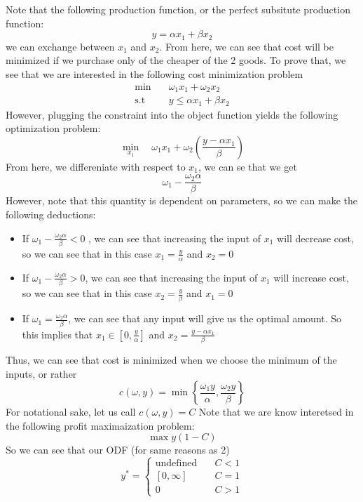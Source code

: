 \documentclass[11pt]{article}
\newcommand{\st}{\text{s.t}}
\begin{document}
\section{}
Note that the following production function, or the perfect subsitute production function:
\[
y = \alpha x_1 + \beta x_2
\]
we can exchange between $x_1$ and $x_2$. From here, we can see that cost will be minimized if we purchase only of the cheaper of the 2 goods. To prove that, we see that we are interested in the following cost minimization problem 
\begin{align*}
    \min & \quad \omega_1 x_1 + \omega_2 x_2\\
    \st & \quad y \leq \alpha x_1 + \beta x_2
\end{align*}
However, plugging the constraint into the object function yields the following optimization problem:
\[
\min_{x_1} \quad \omega_1 x_1 + \omega_2 \left( \frac{y - \alpha x_1}{\beta} \right)
\]
From here, we differeniate with respect to $x_1$, we can se that we get
\[
\omega_1 - \frac{\omega_2 \alpha}{\beta} 
\]
However, note that this quantity is dependent on parameters, so we can make the following deductions:
\begin{itemize}
    \item If $\omega_1 - \frac{\omega_2 \alpha}{\beta} < 0$ , we can see that increasing the input of $x_1$ will decrease cost, so we can see that in this case $x_1 = \frac{y}{\alpha}$ and $x_2 = 0$
    \item If $\omega_1 - \frac{\omega_2 \alpha}{\beta} > 0$, we can see that increasing the input of $x_1$ will increase cost, so we can see that in this case $x_2 = \frac{y}{\beta}$ and $x_1 = 0$
    \item If $\omega_1 = \frac{\omega_2 \alpha}{\beta}$, we can see that any input will give us the optimal amount. So this implies that $x_1 \in [0, \frac{y}{\alpha}]$ and $x_2 = \frac{y - \alpha x_1}{\beta}$
\end{itemize}
Thus, we can see that cost is minimized when we choose the minimum of the inputs, or rather 
\[
c(\omega, y) = \min \left\{  \frac{\omega_1 y}{\alpha}, \frac{\omega_2 y}{\beta}\right\}
\]
For notational sake, let us call $c(\omega, y) = C$ Note that we are know interetsed in the following profit maximaization problem:
\[
\max y (1 - C)
\]
So we can see that our ODF (for same reasons as 2)
\[
y^* = \begin{cases}
    \text{undefined} & \quad C < 1\\
    [0, \infty] & \quad C = 1\\
    0 & \quad C > 1
\end{cases}
\]
\end{document}
